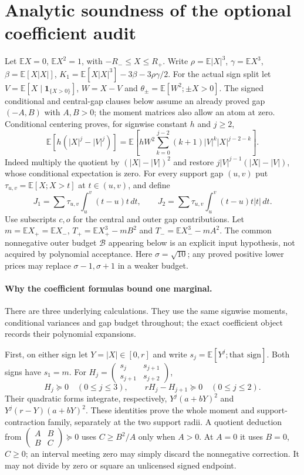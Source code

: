 \documentclass[11pt,a4paper]{article}
\newcommand{\E}{\mathbb E}
\newcommand{\ind}{\mathbf1}
\begin{document}
\section*{Analytic soundness of the optional coefficient audit}
Let $\E X=0$, $\E X^2=1$, with $-R_-\le X\le R_+$.
Write $\rho=\E|X|^3$, $\gamma=\E X^3$, $\beta=\E[X|X|]$,
$K_1=\E[X|X|^3]-3\beta-3\rho\gamma/2$.
For the actual sign split let $V=\E[X\mid\ind_{\{X>0\}}]$,
$W=X-V$ and $\theta_\pm=\E[W^2;\pm X>0]$.
The signed conditional and central-gap clauses below assume an already
proved gap $(-A,B)$ with $A,B>0$; the moment matrices also allow an atom at zero.
Conditional centering proves, for signwise constant $h$ and $j\ge2$,
\[
 \E[h(|X|^j-|V|^j)]
 =\E\left[hW^2\sum_{k=0}^{j-2}(k+1)|V|^k|X|^{j-2-k}\right].
\]
Indeed multiply the quotient by $(|X|-|V|)^2$ and restore
$j|V|^{j-1}(|X|-|V|)$, whose conditional expectation is zero.
For every support gap $(u,v)$ put $\tau_{u,v}=\E[X;X>t]$ at
$t\in(u,v)$, and define
\[
 J_1=\sum\tau_{u,v}\int_u^v(t-u)t\,dt,\qquad
 J_2=\sum\tau_{u,v}\int_u^v(t-u)t|t|\,dt.
\]
Use subscripts $c,o$ for the central and outer gap contributions.
Let $m=\E X_+=\E X_-$,
$T_+=\E X_+^3-mB^2$ and $T_-=\E X_-^3-mA^2$.
The common nonnegative outer budget $\mathcal B$ appearing below is
an explicit input hypothesis, not acquired by polynomial acceptance.
Here $\sigma=\sqrt{10}$; any proved positive lower prices may replace
$\sigma-1,\sigma+1$ in a weaker budget.

\paragraph{Why the coefficient formulas bound one marginal.}
There are three underlying calculations. They use the same signwise
moments, conditional variances and gap budget throughout; the exact
coefficient object records their polynomial expansions.

First, on either sign let $Y=|X|\in[0,r]$ and write
$s_j=\E[Y^j;\text{that sign}]$. Both signs have $s_1=m$.
For $H_j=\left(\begin{smallmatrix}s_j&s_{j+1}\\s_{j+1}&s_{j+2}\end{smallmatrix}\right)$,
\[
 H_j\succeq0\quad(0\le j\le3),\qquad
 rH_j-H_{j+1}\succeq0\quad(0\le j\le2).
\]
Their quadratic forms integrate, respectively,
$Y^j(a+bY)^2$ and $Y^j(r-Y)(a+bY)^2$. These identities prove the
whole moment and support-contraction family, separately at the two
support radii. A quotient deduction from
$\left(\begin{smallmatrix}A&B\\B&C\end{smallmatrix}\right)\succeq0$
uses $C\ge B^2/A$ only when $A>0$. At $A=0$ it uses $B=0$, $C\ge0$;
an interval meeting zero may simply discard the nonnegative correction.
It may not divide by zero or square an unlicensed signed endpoint.
\end{document}
